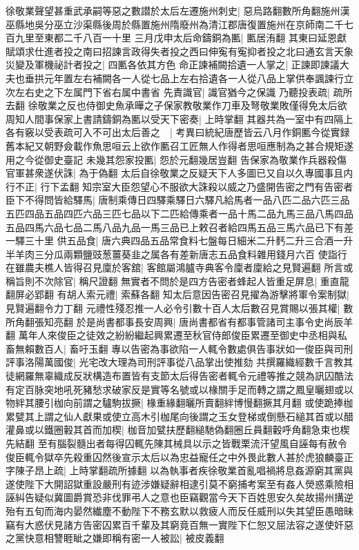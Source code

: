 徐敬業聲望甚重武承嗣等惡之數譛於太后左遷施州刺史|{
	惡烏路翻數所角翻施州漢巫縣地吳分巫立沙渠縣後周於縣置施州隋廢州為清江郡唐復置施州在京師南二千七百九里至東都二千八百一十里}
三月戊申太后命鑄銅為匭|{
	匭居洧翻}
其東曰延恩獻賦頌求仕進者投之南曰招諫言政得失者投之西曰伸寃有寃抑者投之北曰通玄言天象災變及軍機祕計者投之|{
	四匭各依其方色}
命正諫補闕拾遺一人掌之|{
	正諫即諫議大夫也垂拱元年置左右補闕各一人從七品上左右拾遺各一人從八品上掌供奉諷諫行立次左右史之下左属門下省右属中書省}
先責識官|{
	識官猶今之保識}
乃聽投表疏|{
	疏所去翻}
徐敬業之反也侍御史魚承曄之子保家教敬業作刀車及弩敬業敗僅得免太后欲周知人間事保家上書請鑄銅為匭以受天下密奏|{
	上時掌翻}
其器共為一室中有四隔上各有竅以受表疏可入不可出太后善之　|{
	考異曰統紀唐歷皆云八月作銅匭今從實録舊本紀又朝野僉載作魚思咺云上欲作匭召工匠無人作得者思咺應制為之甚合規矩遂用之今從御史臺記}
未幾其怨家投匭|{
	怨於元翻幾居豈翻}
告保家為敬業作兵器殺傷官軍甚衆遂伏誅|{
	為于偽翻}
太后自徐敬業之反疑天下人多圖已又自以久專國事且内行不正|{
	行下孟翻}
知宗室大臣怨望心不服欲大誅殺以威之乃盛開告密之門有告密者臣下不得問皆給驛馬|{
	唐制乘傳日四驛乘驛日六驛凡給馬者一品八匹二品六匹三品五匹四品五品四匹六品三匹七品以下二匹給傳乘者一品十馬二品九馬三品八馬四品五品四馬六品七品二馬八品九品一馬三品已上敕召者給四馬五品三馬六品已下有差一驛三十里}
供五品食|{
	唐六典四品五品常食料七盤每日細米二升麫二升三合酒一升半羊肉三分瓜兩顆鹽豉葱薑葵韭之属各有差新唐志五品食料雜用錢月六百}
使詣行在雖農夫樵人皆得召見廩於客舘|{
	客館屬鴻臚寺典客令廩者廩給之見賢遍翻}
所言或稱旨則不次除官|{
	稱尺證翻}
無實者不問於是四方告密者蜂起人皆重足屏息|{
	重直龍翻屏必郢翻}
有胡人索元禮|{
	索蘇各翻}
知太后意因告密召見擢為游擊將軍令案制獄|{
	見賢遍翻令力丁翻}
元禮性殘忍推一人必令引數十百人太后數召見賞賜以張其權|{
	數所角翻張知亮翻}
於是尚書都事長安周興|{
	唐尚書都省有都事管諸司主事令史尚辰羊翻}
萬年人來俊臣之徒效之紛紛繼起興累遷至秋官侍郎俊臣累遷至御史中丞相與私畜無賴數百人|{
	畜吁玉翻}
專以告密為事欲陷一人輒令數處俱告事狀如一俊臣與司刑評事洛陽萬國俊|{
	光宅改大理為司刑評事從八品掌出使推劾}
共撰羅織經數千言教其徒網羅無辜織成反狀構造布置皆有支節太后得告密者輒令元禮等推之競為訊囚酷法有定百脉突地吼死豬愁求破家反是實等名號或以椽關手足而轉之謂之鳳皇曬翅或以物絆其腰引枷向前謂之驢駒拔撅|{
	椽重緣翻曬所賣翻絆博慢翻撅其月翻}
或使跪捧枷累甓其上謂之仙人獻果或使立高木引枷尾向後謂之玉女登梯或倒懸石縋其首或以醋灌鼻或以鐵圈轂其首而加楔|{
	枷音加甓扶歷翻縋馳偽翻圈丘員翻轂呼角翻急束也楔先結翻}
至有腦裂髓出者每得囚輒先陳其械具以示之皆戰栗流汗望風自誣每有赦令俊臣輒令獄卒先殺重囚然後宣示太后以為忠益寵任之中外畏此數人甚於虎狼麟臺正字陳子昂上疏|{
	上時掌翻疏所據翻}
以為執事者疾徐敬業首亂唱禍將息姦源窮其黨與遂使陛下大開詔獄重設嚴刑有迹涉嫌疑辭相逮引莫不窮捕考案至有姦人熒惑乘險相誣糾告疑似冀圖爵賞恐非伐罪弔人之意也臣竊觀當今天下百姓思安久矣故揚州搆逆殆有五旬而海内晏然纎塵不動陛下不務玄默以救疲人而反任威刑以失其望臣愚暗昧竊有大惑伏見諸方告密囚累百千輩及其窮竟百無一實陛下仁恕又屈法容之遂使奸惡之黨快意相讐睚眦之嫌即稱有密一人被訟|{
	被皮義翻}
